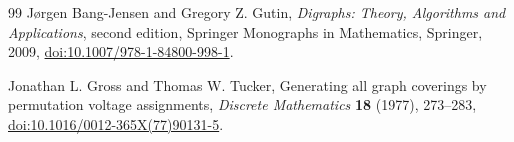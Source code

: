 \documentclass[11pt,a4paper,reqno]{amsart}
\theoremstyle{definition}
\theoremstyle{remark}
\numberwithin{equation}{section}
\begin{document}
\begin{thebibliography}{99}
J\o rgen Bang-Jensen and Gregory Z. Gutin, \emph{Digraphs: Theory, Algorithms and Applications}, second edition, Springer Monographs in Mathematics, Springer, 2009, \href{https://doi.org/10.1007/978-1-84800-998-1}{doi:10.1007/978-1-84800-998-1}.

Jonathan L. Gross and Thomas W. Tucker, Generating all graph coverings by permutation voltage assignments, \emph{Discrete Mathematics} \textbf{18} (1977), 273--283, \href{https://doi.org/10.1016/0012-365X(77)90131-5}{doi:10.1016/0012-365X(77)90131-5}.
\enlargethispage{2\baselineskip}
\end{thebibliography}
\end{document}
